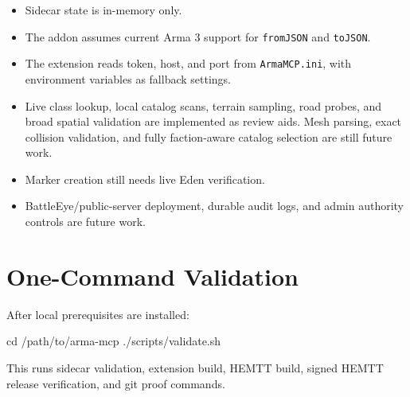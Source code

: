 \documentclass[11pt]{article}
\newcommand{\code}[1]{\texttt{#1}}
\begin{document}
\begin{itemize}
  \item Sidecar state is in-memory only.
  \item The addon assumes current Arma 3 support for \code{fromJSON} and \code{toJSON}.
  \item The extension reads token, host, and port from \code{ArmaMCP.ini}, with environment variables as fallback settings.
  \item Live class lookup, local catalog scans, terrain sampling, road probes, and
        broad spatial validation are implemented as review aids. Mesh parsing,
        exact collision validation, and fully faction-aware catalog selection are
        still future work.
  \item Marker creation still needs live Eden verification.
  \item BattleEye/public-server deployment, durable audit logs, and admin
        authority controls are future work.
\end{itemize}

\section{One-Command Validation}

After local prerequisites are installed:

\begin{commandblock}
cd /path/to/arma-mcp
./scripts/validate.sh
\end{commandblock}

This runs sidecar validation, extension build, HEMTT build, signed HEMTT release
verification, and git proof commands.
\end{document}
